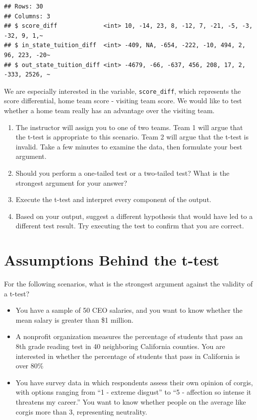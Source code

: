\documentclass[
]{book}
\theoremstyle{definition}
\theoremstyle{definition}
\theoremstyle{definition}
\theoremstyle{definition}
\theoremstyle{remark}
\begin{document}
\begin{verbatim}
## Rows: 30
## Columns: 3
## $ score_diff             <int> 10, -14, 23, 8, -12, 7, -21, -5, -3, -32, 9, 1,~
## $ in_state_tuition_diff  <int> -409, NA, -654, -222, -10, 494, 2, 96, 223, -20~
## $ out_state_tuition_diff <int> -4679, -66, -637, 456, 208, 17, 2, -333, 2526, ~
\end{verbatim}

We are especially interested in the variable, \texttt{score\_diff}, which represents the score differential, home team score - visiting team score. We would like to test whether a home team really has an advantage over the visiting team.

\begin{enumerate}
\def\labelenumi{\arabic{enumi}.}
\item
  The instructor will assign you to one of two teams. Team 1 will argue that the t-test is appropriate to this scenario. Team 2 will argue that the t-test is invalid. Take a few minutes to examine the data, then formulate your best argument.
\item
  Should you perform a one-tailed test or a two-tailed test? What is the strongest argument for your answer?
\item
  Execute the t-test and interpret every component of the output.
\item
  Based on your output, suggest a different hypothesis that would have led to a different test result. Try executing the test to confirm that you are correct.
\end{enumerate}

\hypertarget{assumptions-behind-the-t-test}{%
\section{Assumptions Behind the t-test}\label{assumptions-behind-the-t-test}}

For the following scenarios, what is the strongest argument against the validity of a t-test?

\begin{itemize}
\item
  You have a sample of 50 CEO salaries, and you want to know whether the mean salary is greater than \$1 million.
\item
  A nonprofit organization measures the percentage of students that pass an 8th grade reading test in 40 neighboring California counties. You are interested in whether the percentage of students that pass in California is over 80\%
\item
  You have survey data in which respondents assess their own opinion of corgis, with options ranging from ``1 - extreme disgust'' to ``5 - affection so intense it threatens my career.'' You want to know whether people on the average like corgis more than 3, representing neutrality.
\end{itemize}
\end{document}
